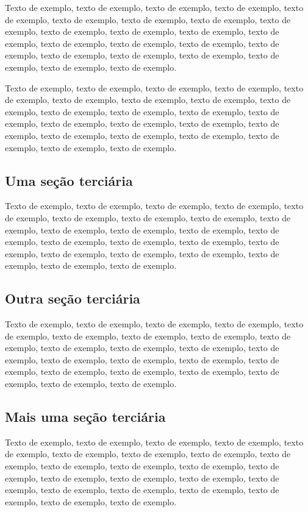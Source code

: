 \documentclass[
	12pt,				%
	oneside,			%
	a4paper,			%
	english,			%
	brazil				%
	]{abntex2ppgsi}
\begin{document}
Texto de exemplo, texto de exemplo, texto de exemplo, texto de exemplo, texto de exemplo, texto de exemplo, texto de exemplo, texto de exemplo, texto de exemplo, texto de exemplo, texto de exemplo, texto de exemplo, texto de exemplo, texto de exemplo, texto de exemplo, texto de exemplo, texto de exemplo, texto de exemplo, texto de exemplo, texto de exemplo, texto de exemplo, texto de exemplo, texto de exemplo.

Texto de exemplo, texto de exemplo, texto de exemplo, texto de exemplo, texto de exemplo, texto de exemplo, texto de exemplo, texto de exemplo, texto de exemplo, texto de exemplo, texto de exemplo, texto de exemplo, texto de exemplo, texto de exemplo, texto de exemplo, texto de exemplo, texto de exemplo, texto de exemplo, texto de exemplo, texto de exemplo, texto de exemplo, texto de exemplo, texto de exemplo.

\subsection{Uma seção terciária}

Texto de exemplo, texto de exemplo, texto de exemplo, texto de exemplo, texto de exemplo, texto de exemplo, texto de exemplo, texto de exemplo, texto de exemplo, texto de exemplo, texto de exemplo, texto de exemplo, texto de exemplo, texto de exemplo, texto de exemplo, texto de exemplo, texto de exemplo, texto de exemplo, texto de exemplo, texto de exemplo, texto de exemplo, texto de exemplo, texto de exemplo.

\subsection{Outra seção terciária}

Texto de exemplo, texto de exemplo, texto de exemplo, texto de exemplo, texto de exemplo, texto de exemplo, texto de exemplo, texto de exemplo, texto de exemplo, texto de exemplo, texto de exemplo, texto de exemplo, texto de exemplo, texto de exemplo, texto de exemplo, texto de exemplo, texto de exemplo, texto de exemplo, texto de exemplo, texto de exemplo, texto de exemplo, texto de exemplo, texto de exemplo.

\subsection{Mais uma seção terciária}

Texto de exemplo, texto de exemplo, texto de exemplo, texto de exemplo, texto de exemplo, texto de exemplo, texto de exemplo, texto de exemplo, texto de exemplo, texto de exemplo, texto de exemplo, texto de exemplo, texto de exemplo, texto de exemplo, texto de exemplo, texto de exemplo, texto de exemplo, texto de exemplo, texto de exemplo, texto de exemplo, texto de exemplo, texto de exemplo, texto de exemplo.
\end{document}
